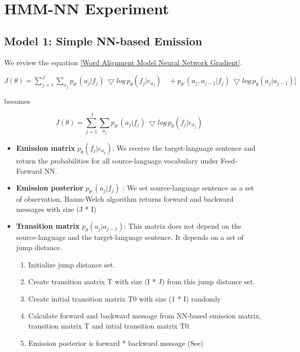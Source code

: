 \documentclass{article}
\begin{document}
\section{HMM-NN Experiment}
\subsection{Model 1: Simple NN-based Emission}
We review the equation \eqref{Word Alignment Model Neural Network Gradient}.

$
J(\theta) = \sum_{j=1}^J \sum_{a_j} p_{\theta'}(a_j|f_j) \, \bigtriangledown log \, p_{\theta}(f_j | e_{a_j}) \quad + p_{\theta'}(a_j, a_{j-1}|f_j) \, \bigtriangledown log \, p_{\theta}(a_j | a_{j-1})  ] 
$

becomes

\begin{equation}
J(\theta) = \sum_{j=1}^J \sum_{a_j} p_{\theta'}(a_j|f_j) \, \bigtriangledown log \, p_{\theta}(f_j | e_{a_j}) \quad
\end{equation}


\begin{itemize}
\item \textbf{Emission matrix }$p_{\theta}(f_j | e_{a_j})$: We receive the target-language sentence and return the probabilities for all source-language vocabulary under Feed-Forward NN.

\item \textbf{Emission posterior} $p_{\theta'}(a_j|f_j)$ : We set source-language sentence as a set of observation, Baum-Welch algorithm returns forward and backward messages with size (J * I)

\item \textbf{Transition matrix} $p_{\theta}(a_j | a_{j-1})$: This matrix does not depend on the source-language and the target-language sentence. It depends on a set of jump distance.
	\begin{enumerate}
	\item Initialize jump distance set.
	\item Create transition matrix T with size (I * J) from this jump distance set.
	\item Create initial transition matrix  T0 with size (1 * I) randomly
	\item Calculate forward and backward message from NN-based emission matrix, transition matrix T and intial transition matrix T0.
	\item Emission posterior is forward * backward message (See\cite{Tran16unsupervised})
	\end{enumerate}
\end{itemize}
\end{document}
